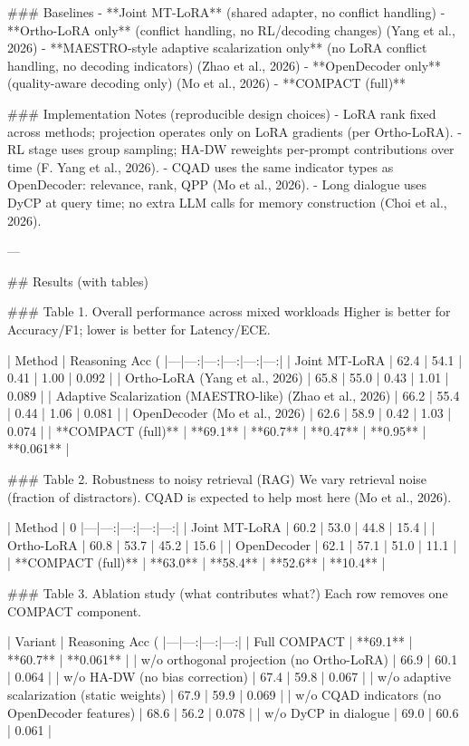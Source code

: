 ### Baselines  
- **Joint MT-LoRA** (shared adapter, no conflict handling)  
- **Ortho-LoRA only** (conflict handling, no RL/decoding changes) (Yang et al., 2026)  
- **MAESTRO-style adaptive scalarization only** (no LoRA conflict handling, no decoding indicators) (Zhao et al., 2026)  
- **OpenDecoder only** (quality-aware decoding only) (Mo et al., 2026)  
- **COMPACT (full)**

### Implementation Notes (reproducible design choices)  
- LoRA rank fixed across methods; projection operates only on LoRA gradients (per Ortho-LoRA).  
- RL stage uses group sampling; HA-DW reweights per-prompt contributions over time (F. Yang et al., 2026).  
- CQAD uses the same indicator types as OpenDecoder: relevance, rank, QPP (Mo et al., 2026).  
- Long dialogue uses DyCP at query time; no extra LLM calls for memory construction (Choi et al., 2026).

---

## Results (with tables)

### Table 1. Overall performance across mixed workloads  
Higher is better for Accuracy/F1; lower is better for Latency/ECE.

| Method | Reasoning Acc (%
|---|---:|---:|---:|---:|---:|
| Joint MT-LoRA | 62.4 | 54.1 | 0.41 | 1.00 | 0.092 |
| Ortho-LoRA (Yang et al., 2026) | 65.8 | 55.0 | 0.43 | 1.01 | 0.089 |
| Adaptive Scalarization (MAESTRO-like) (Zhao et al., 2026) | 66.2 | 55.4 | 0.44 | 1.06 | 0.081 |
| OpenDecoder (Mo et al., 2026) | 62.6 | 58.9 | 0.42 | 1.03 | 0.074 |
| **COMPACT (full)** | **69.1** | **60.7** | **0.47** | **0.95** | **0.061** |

### Table 2. Robustness to noisy retrieval (RAG)  
We vary retrieval noise (fraction of distractors). CQAD is expected to help most here (Mo et al., 2026).

| Method | 0%
|---|---:|---:|---:|---:|
| Joint MT-LoRA | 60.2 | 53.0 | 44.8 | 15.4 |
| Ortho-LoRA | 60.8 | 53.7 | 45.2 | 15.6 |
| OpenDecoder | 62.1 | 57.1 | 51.0 | 11.1 |
| **COMPACT (full)** | **63.0** | **58.4** | **52.6** | **10.4** |

### Table 3. Ablation study (what contributes what?)  
Each row removes one COMPACT component.

| Variant | Reasoning Acc (%
|---|---:|---:|---:|
| Full COMPACT | **69.1** | **60.7** | **0.061** |
| w/o orthogonal projection (no Ortho-LoRA) | 66.9 | 60.1 | 0.064 |
| w/o HA-DW (no bias correction) | 67.4 | 59.8 | 0.067 |
| w/o adaptive scalarization (static weights) | 67.9 | 59.9 | 0.069 |
| w/o CQAD indicators (no OpenDecoder features) | 68.6 | 56.2 | 0.078 |
| w/o DyCP in dialogue | 69.0 | 60.6 | 0.061 |

